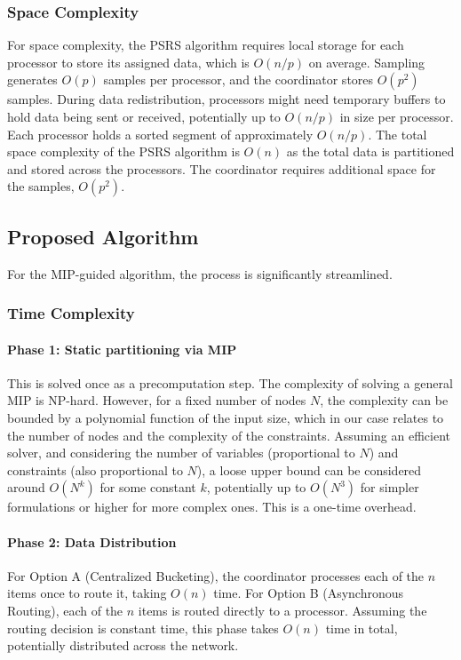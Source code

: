 \documentclass[]{interact}
\theoremstyle{plain}
\theoremstyle{definition}
\theoremstyle{remark}
\begin{document}
\subsubsection{Space Complexity}
For space complexity, the PSRS algorithm requires local storage for each processor to store its assigned data, which is $O(n/p)$ on average. Sampling generates $O(p)$ samples per processor, and the coordinator stores $O(p^2)$ samples. During data redistribution, processors might need temporary buffers to hold data being sent or received, potentially up to $O(n/p)$ in size per processor. Each processor holds a sorted segment of approximately $O(n/p)$. The total space complexity of the PSRS algorithm is $O(n)$ as the total data is partitioned and stored across the processors. The coordinator requires additional space for the samples, $O(p^2)$.

\subsection{Proposed Algorithm}
For the MIP-guided algorithm, the process is significantly streamlined. 

\subsubsection{Time Complexity}
\paragraph{Phase 1: Static partitioning via MIP}
This is solved once as a precomputation step. The complexity of solving a general MIP is NP-hard. However, for a fixed number of nodes $N$, the complexity can be bounded by a polynomial function of the input size, which in our case relates to the number of nodes and the complexity of the constraints. Assuming an efficient solver, and considering the number of variables (proportional to $N$) and constraints (also proportional to $N$), a loose upper bound can be considered around $O(N^k)$ for some constant $k$, potentially up to $O(N^3)$ for simpler formulations or higher for more complex ones. This is a one-time overhead.

\paragraph{Phase 2: Data Distribution} For Option A (Centralized Bucketing), the coordinator processes each of the $n$ items once to route it, taking $O(n)$ time. For Option B (Asynchronous Routing), each of the $n$ items is routed directly to a processor. Assuming the routing decision is constant time, this phase takes $O(n)$ time in total, potentially distributed across the network.
\end{document}
